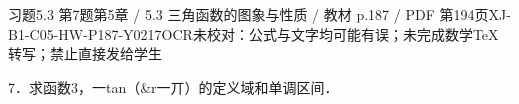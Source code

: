 \begin{bankitem}{习题5.3 第7题}{第5章 / 5.3 三角函数的图象与性质 / 教材 p.187 / PDF 第194页}{XJ-B1-C05-HW-P187-Y0217}{OCR未校对：公式与文字均可能有误；未完成数学TeX转写；禁止直接发给学生}
\begin{ocrdraft}
\par
7．求函数3，一tan（\&r一丌）的定义域和单调区间．
\end{ocrdraft}
\end{bankitem}
